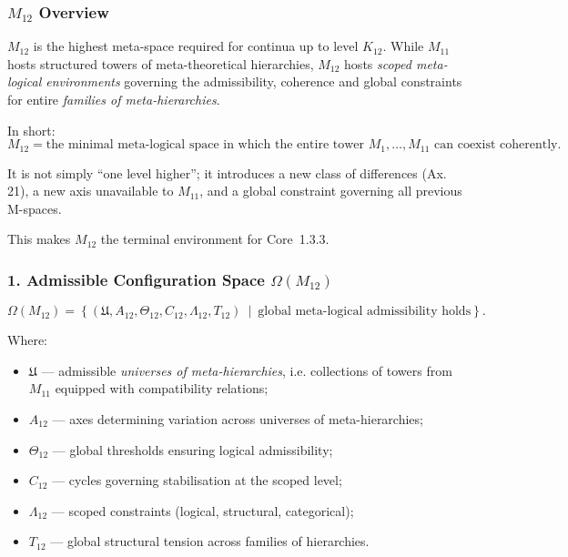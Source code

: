 

\subsubsection{$M_{12}$ Overview}
\label{sec:m12-overview}

$M_{12}$ is the highest meta-space required for continua up to level $K_{12}$.
While $M_{11}$ hosts structured towers of meta-theoretical hierarchies,
$M_{12}$ hosts \emph{scoped meta-logical environments} governing the
admissibility, coherence and global constraints for entire \emph{families of
meta-hierarchies}.

In short:
\[
M_{12} = \text{the minimal meta-logical space in which the entire tower }
M_1, \ldots, M_{11} \text{ can coexist coherently.}
\]

It is not simply “one level higher”;
it introduces a new class of differences (Ax. 21),
a new axis unavailable to $M_{11}$,
and a global constraint governing all previous M-spaces.

This makes $M_{12}$ the terminal environment for Core~1.3.3.

\subsubsection*{1. Admissible Configuration Space $\Omega(M_{12})$}

\[
\Omega(M_{12}) =
\left\{
\left( \mathfrak{U}, A_{12}, \Theta_{12},
C_{12}, \Lambda_{12}, T_{12} \right)
\ \middle|\
\text{global meta-logical admissibility holds}
\right\}.
\]

Where:

\begin{itemize}
    \item $\mathfrak{U}$ — admissible \emph{universes of meta-hierarchies},
          i.e. collections of towers from $M_{11}$ equipped with compatibility relations;
    \item $A_{12}$ — axes determining variation across universes of meta-hierarchies;
    \item $\Theta_{12}$ — global thresholds ensuring logical admissibility;
    \item $C_{12}$ — cycles governing stabilisation at the scoped level;
    \item $\Lambda_{12}$ — scoped constraints (logical, structural, categorical);
    \item $T_{12}$ — global structural tension across families of hierarchies.
\end{itemize}

